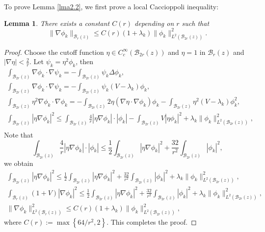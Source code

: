 \documentclass{article}
\numberwithin{equation}{section}
\newtheorem{lemma}[theorem]{Lemma}
\numberwithin{equation}{section}
\theoremstyle{definition}
\begin{document}
To prove Lemma \ref{lma2.2}, we first prove a local Caccioppoli inequality:
\begin{lemma}
	There exists a constant $C(r)$ depending on $r$ such that
	\begin{equation}
		\|\nabla \phi_k\|_{\mathcal{B}_r(z)}\le C(r)\left( 1+\lambda_k \right) \|\phi_k\|^2_{L^2(\mathcal{B}_{2r}(z))}.
	\end{equation}
\end{lemma}
\begin{proof}
	Choose the cutoff function $\eta \in C_c^{\infty}\left( \mathcal{B}_{2r}(z) \right) $ and $\eta =1$ in $\mathcal{B}_r(z)$ and $|\nabla \eta |< \frac{2}{r}$. Let $\psi_k= \eta^2 \phi_k$, then
	\begin{gather*}
		\int_{\mathcal{B}_{2r}(z)}\nabla \phi_k \cdot \nabla \psi_k=-\int_{\mathcal{B}_{2r}(z)}\psi_k \Delta \phi_k,\\
		\int_{\mathcal{B}_{2r}(z)}\nabla \phi_k\cdot \nabla \psi_k=-\int_{\mathcal{B}_{2r}(z)}\psi_k \left( V-\lambda_k \right)\phi_k,\\
		\int_{\mathcal{B}_{2r}(z)} \eta^2 \nabla \phi_k \cdot \nabla \phi_k= - \int_{\mathcal{B}_{2r}(z)} 2 \eta (\nabla  \eta \cdot \nabla \phi_k) \phi_k- \int_{\mathcal{B}_{2r}(z)}\eta^2 \left( V-\lambda_k \right) \phi_k^2,\\
		\int_{\mathcal{B}_{2r}(z)}|\eta \nabla \phi_k|^2\le \int_{\mathcal{B}_{2r}(z)}\frac{4}{r} |\eta\nabla \phi_k| \cdot |\phi_k|-\int_{\mathcal{B}_{2r}(z)}V|\eta\phi_k|^2+ \lambda_k \|\phi_k\|_{L^2(\mathcal{B}_{2r}(z))} ^2,\\
	\end{gather*}
	Note that $$\int_{\mathcal{B}_{2r}(z)}\frac{4}{r}|\eta \nabla \phi_k|\cdot |\phi_k|\le \frac{1}{2}\int_{\mathcal{B}_{2r}(z)}|\eta \nabla \phi_k|^2+\frac{32}{r^2}\int_{\mathcal{B}_{2r}(z)}|\phi_k|^2,$$ we obtain 
	\begin{gather*}
		\int_{\mathcal{B}_{2r}(z)}|\eta \nabla \phi_k|^2\le \frac{1}{2}\int_{\mathcal{B}_{2r}(z)}|\eta \nabla \phi_k|^2 + \frac{32}{r^2}\int_{\mathcal{B}_{2r}(z)} |\phi_k|^2+\lambda_k \|\phi_k\|^2_{L^2(\mathcal{B}_{2r}(z))}, \\
		\int_{\mathcal{B}_r(z)}(1+V)|\nabla \phi_k|^2\le \frac{1}{2}\int_{\mathcal{B}_{2r}(z)}|\eta\nabla\phi_k|^2+ \frac{32}{r^2}\int_{\mathcal{B}_{2r}(z)}|\phi_k|^2+\lambda_k\|\phi_k\|^2_{L^2(\mathcal{B}_{2r}(z))},\\
		\|\nabla \phi_k\|^2_{L^2(\mathcal{B}_{r}(z))}\le C(r)(1+\lambda_k)\|\phi_k\|^2_{L^2(\mathcal{B}_{2r}(z))},
	\end{gather*}
	where $C(r):= \max \left\{ 64 /r^2, 2\right\} $.
This completes the proof.
\end{proof}
\end{document}
